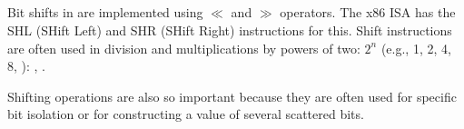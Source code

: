\subsection{\ShiftsSectionName}

Bit shifts in \CCpp are implemented using $\ll$ and $\gg$ operators.
The x86 \ac{ISA} has the SHL (SHift Left) and SHR (SHift Right) instructions for this.
Shift instructions are often used in division and multiplications by powers of two: $2^{n}$ (e.g., 1, 2, 4, 8, \etc{}):
,
.


Shifting operations are also so important because they are often used for specific bit isolation
or for constructing a value of several scattered bits.
